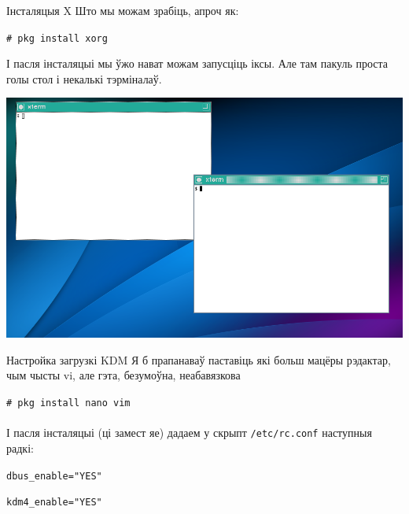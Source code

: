 \documentclass[ignorenonframetext,hyperref={pdftex,unicode}]{beamer}
\begin{document}
\begin{frame}{Інсталяцыя X} %
	Што мы можам зрабіць, апроч як:

	\texttt{\# pkg install xorg} \pause
	
	І пасля інсталяцыі мы ўжо нават можам запусціць іксы. Але там пакуль проста голы стол і некалькі тэрміналаў.
	\begin{center}
 		\includegraphics[height=0.6\textheight,keepaspectratio]{TWM} %
	\end{center}
\end{frame} %

\begin{frame}{Настройка загрузкі KDM} %
	Я б прапанаваў паставіць які больш мацёры рэдактар, чым чысты vi, але гэта, безумоўна, неабавязкова

	\texttt{\# pkg install nano vim} \pause
	\\~\\	
	І пасля інсталяцыі (ці замест яе) дадаем у скрыпт \texttt{/etc/rc.conf} наступныя радкі:

	\texttt{dbus\_enable="YES"}
	
	\texttt{kdm4\_enable="YES"}
\end{frame} %
\end{document}
